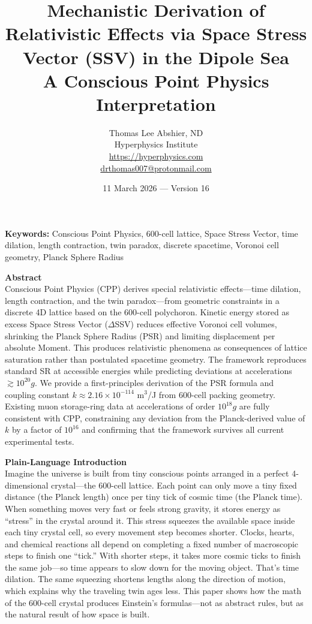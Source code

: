 \documentclass[11pt,letterpaper]{article}
\title{\textbf{Mechanistic Derivation of Relativistic Effects via Space Stress Vector (SSV) in the Dipole Sea} \\[0.5em]
\large A Conscious Point Physics Interpretation}
\author{Thomas Lee Abshier, ND\\
Hyperphysics Institute \\
\url{https://hyperphysics.com} \\
\href{mailto:drthomas007@protonmail.com}{drthomas007@protonmail.com}}
\date{11 March 2026 --- Version 16}
\begin{document}
\maketitle

\noindent\textbf{Keywords:} Conscious Point Physics, 600-cell lattice, Space Stress Vector, time dilation, length contraction, twin paradox, discrete spacetime, Voronoi cell geometry, Planck Sphere Radius

\bigskip

\noindent\textbf{Abstract}\\
Conscious Point Physics (CPP) derives special relativistic effects---time dilation, length contraction, and the twin paradox---from geometric constraints in a discrete 4D lattice based on the 600-cell polychoron. Kinetic energy stored as excess Space Stress Vector ($\Delta$SSV) reduces effective Voronoi cell volumes, shrinking the Planck Sphere Radius (PSR) and limiting displacement per absolute Moment. This produces relativistic phenomena as consequences of lattice saturation rather than postulated spacetime geometry. The framework reproduces standard SR at accessible energies while predicting deviations at accelerations $\gtrsim 10^{20}g$. We provide a first-principles derivation of the PSR formula and coupling constant $k \approx 2.16 \times 10^{-114}$ m$^3$/J from 600-cell packing geometry. Existing muon storage-ring data at accelerations of order $10^{18}g$ are fully consistent with CPP, constraining any deviation from the Planck-derived value of $k$ by a factor of $10^{16}$ and confirming that the framework survives all current experimental tests.

\bigskip

\noindent\textbf{Plain-Language Introduction}\\
Imagine the universe is built from tiny conscious points arranged in a perfect 4-dimensional crystal---the 600-cell lattice. Each point can only move a tiny fixed distance (the Planck length) once per tiny tick of cosmic time (the Planck time). When something moves very fast or feels strong gravity, it stores energy as ``stress'' in the crystal around it. This stress squeezes the available space inside each tiny crystal cell, so every movement step becomes shorter. Clocks, hearts, and chemical reactions all depend on completing a fixed number of macroscopic steps to finish one ``tick.'' With shorter steps, it takes more cosmic ticks to finish the same job---so time appears to slow down for the moving object. That's time dilation. The same squeezing shortens lengths along the direction of motion, which explains why the traveling twin ages less. This paper shows how the math of the 600-cell crystal produces Einstein's formulas---not as abstract rules, but as the natural result of how space is built.
\end{document}

